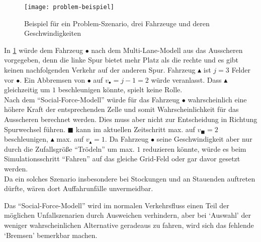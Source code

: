 \begin{figure}[hptb]
 \centering
 \texttt{[image: problem-beispiel]}
 \caption[Problem-Beispiel]{Beispiel für ein Problem-Szenario, drei Fahrzeuge und deren Geschwindigkeiten}
 \label{figure:problem-beispiel}
\end{figure}

\noindent
In \cref{figure:problem-beispiel} würde dem Fahrzeug $\bullet$ nach dem Multi-Lane-Modell aus \cite{multi-lane} das Ausscheren vorgegeben, denn die linke Spur bietet mehr Platz als die rechte und es gibt keinen nachfolgenden Verkehr auf der anderen Spur. 
Fahrzeug $\blacktriangle$ ist $j=3$ Felder vor $\bullet$.
Ein Abbremsen von $\bullet$ auf $v_{\bullet}=j-1=2$ würde veranlasst.
Dass $\blacktriangle$ gleichzeitig um $1$ beschleunigen könnte, spielt keine Rolle. \\
Nach dem \enquote{Social-Force-Modell} würde für das Fahrzeug $\bullet$ wahrscheinlich eine höhere Kraft der entsprechenden Zelle und somit Wahrscheinlichkeit für das Ausscheren berechnet werden.
Dies muss aber nicht zur Entscheidung in Richtung Spurwechsel führen.
$\blacksquare$ kann im aktuellen Zeitschritt max. auf $v_{\blacksquare}=2$ beschleunigen, $\blacktriangle$ max. auf $v_{\blacktriangle}=1$.
Da Fahrzeug $\bullet$ seine Geschwindigkeit aber nur durch die Zufallsgröße \enquote{Trödeln} um max. $1$ reduzieren könnte, würde es beim Simulationsschritt \enquote{Fahren} auf das gleiche Grid-Feld oder gar davor gesetzt werden. \\
Da ein solches Szenario insbesondere bei Stockungen und an Stauenden auftreten dürfte, wären dort Auffahrunfälle unvermeidbar. 

Das \enquote{Social-Force-Modell} wird im normalen Verkehrsfluss einen Teil der möglichen Unfallszenarien durch Ausweichen verhindern, aber bei \enquote*{Auswahl} der weniger wahrscheinlichen Alternative geradeaus zu fahren, wird sich das fehlende \enquote*{Bremsen} bemerkbar machen.
